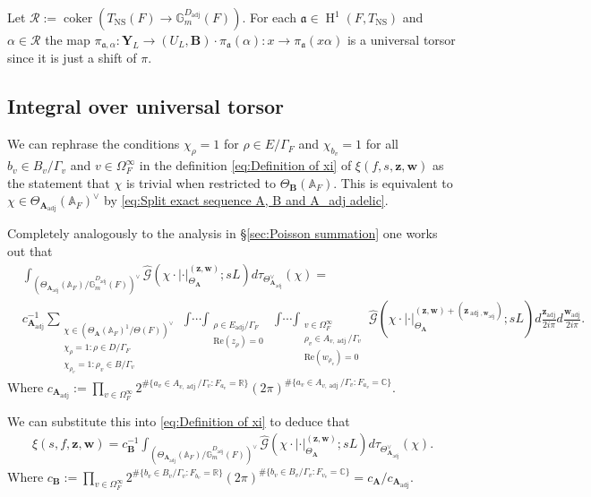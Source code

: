 \documentclass[a4paper,11pt,reqno]{amsart}
\newcommand{\R}{\mathbb{R}}
\newcommand{\C}{\mathbb{C}}
\newcommand{\G}{\mathbb{G}}
\newcommand{\A}{\mathbb{A}}
\DeclareMathOperator{\coker}{coker}
\DeclareMathOperator{\NS}{NS}
\DeclareMathOperator{\HH}{H}
\DeclareMathOperator{\adj}{adj}
\renewcommand{\Re}{\mathrm{Re}}
\theoremstyle{definition}
\begin{document}
Let $\mathcal{R} := \coker(T_{\NS}(F) \to \G_m^{D_{\adj}}(F))$. For each $\mathfrak{a} \in \HH^1(F, T_{\NS})$ and $\alpha \in \mathcal{R}$ the map $\pi_{\mathfrak{a}, \alpha}: \mathbf{Y}_L \to (U_L, \mathbf{B}) \cdot \pi_{\mathfrak{a}}(\alpha): x \to \pi_{\mathfrak{a}}(x \alpha)$ is a universal torsor since it is just a shift of $\pi$.
\subsection{Integral over universal torsor}
We can rephrase the conditions $\chi_{\rho} = 1$ for $\rho \in E/\Gamma_F$ and $\chi_{b_v} = 1$ for all $b_v \in B_v/\Gamma_v$ and $v \in \Omega_{F}^{\infty}$ in the definition \eqref{eq:Definition of xi} of $\xi(f, s, \bm{z}, \bm{w})$ as the statement that $\chi$ is trivial when restricted to $\Theta_{\mathbf{B}}(\A_F)$. This is equivalent to $\chi \in \Theta_{\mathbf{A}_{\adj}}(\A_F)^{\vee}$ by \eqref{eq:Split exact sequence A, B and A_adj adelic}.

Completely analogously to the analysis in \S\ref{sec:Poisson summation} one works out that
\[
\begin{split}
	&\int_{(\Theta_{\mathbf{A}_{\adj}}(\A_F)/\G_m^{D_{\adj}}(F))^{\vee}} \hat{\mathcal{G}}(\chi \cdot | \cdot|_{\Theta_{\mathbf{A}}}^{(\bm{z}, \bm{w})}; s L) d\tau_{\Theta_{\mathbf{A }_{\adj}}^{\vee}}(\chi) = \\
	&c_{\mathbf{A}_{\adj}}^{-1} \sum_{\substack{\chi \in (\Theta_{\mathbf{A}}(\A_F)^1/\Theta(F))^{\vee} \\ \chi_{\rho} = 1: \rho \in D/\Gamma_F \\ \chi_{\rho_v} = 1: \rho_v \in B/\Gamma_v}}
	\mathop{\int \cdots \int}_{\substack{\rho \in E_{\adj} / \Gamma_F \\ \Re(z_{\rho}) = 0}}\mathop{\int \cdots \int}_{\substack{v \in \Omega_F^{\infty} \\ \rho_v \in A_{v, \adj} /\Gamma_v \\ \Re(w_{\rho_v}) = 0}} 
	\hat{\mathcal{G}}(\chi \cdot | \cdot|_{\Theta_{\mathbf{A}}}^{(\bm{z}, \bm{w}) + (\bm{z}_{\adj, \bm{w}_{\adj}})}; s L) d\frac{\bm{z}_{\adj}}{2 i \pi} d \frac{\bm{w}_{\adj}}{2 i \pi}.
\end{split}
\]
Where $c_{\mathbf{A}_{\adj}} := \prod_{v \in \Omega_{F}^{\infty}} 2^{\# \{a_v \in A_{v, \adj} / \Gamma_v : F_{a_v} = \R\}} (2 \pi)^{\# \{a_v \in A_{v, \adj} / \Gamma_v : F_{a_v} = \C\}}$.

We can substitute this into \eqref{eq:Definition of xi} to deduce that 
\begin{equation}\label{eq:Xi function is integral over characters}
	\begin{split}
		\xi(s, f, \bm{z}, \bm{w}) = c_{\mathbf{B}}^{-1} \int_{(\Theta_{\mathbf{A}_{\adj}}(\A_F)/\G_m^{D_{\adj}}(F))^{\vee}} \hat{\mathcal{G}}(\chi \cdot | \cdot|_{\Theta_{\mathbf{A}}}^{(\bm{z}, \bm{w})}; s L) d\tau_{\Theta_{\mathbf{A}_{\adj}}^{\vee}}(\chi).
	\end{split}
\end{equation}
Where $c_{\mathbf{B}} := \prod_{v \in \Omega_{F}^{\infty}} 2^{\# \{b_v \in B_v / \Gamma_v : F_{b_v} = \R\}} (2 \pi)^{\# \{b_v \in B_v / \Gamma_v : F_{v_v} = \C\}} = c_{\mathbf{A}}/c_{\mathbf{A}_{\adj}}$.
\end{document}
